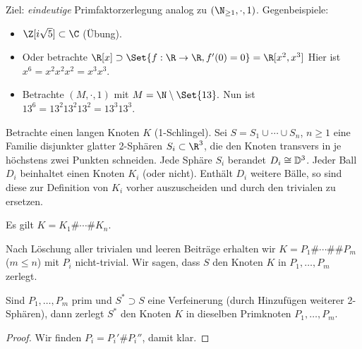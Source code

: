 Ziel: \emph{eindeutige} Primfaktorzerlegung analog zu $(\N_{\ge 1}, \cdot, 1)$.
Gegenbeispiele:
\begin{itemize}
    \item
        $\Z[i\sqrt{5}] \subset \C$ (Übung).
    \item
        Oder betrachte
        \begin{math}
            \R[x] \supset \Set{f: \R \to \R, f'(0) = 0} = \R[x^2, x^3]
        \end{math}
        Hier ist $x^6 = x^2 x^2 x^2 = x^3 x^3$.
    \item
        Betrachte $(M, \cdot, 1)$ mit
        \begin{math}
            M = \N \setminus \Set{13}.
        \end{math}
        Nun ist ${13}^6 = {13}^2 {13}^2 {13}^2 = {13}^3 {13}^3$.
\end{itemize}
Betrachte einen langen Knoten $K$ (1-Schlingel).
Sei $S = S_1 \cup \dotsb \cup S_n$, $n \ge 1$ eine Familie disjunkter glatter 2-Sphären $S_i \subset \R^3$, die den Knoten transvers in je höchstens zwei Punkten schneiden.
Jede Sphäre $S_i$ berandet $D_i \cong \mathbb { D }^3$.
Jeder Ball $D_i$ beinhaltet einen Knoten $K_i$ (oder nicht).
Enthält $D_i$ weitere Bälle, so sind diese zur Definition von $K_i$ vorher auszuscheiden und durch den trivialen zu ersetzen.

\begin{prop}
    Es gilt $K = K_1 \# \dotsb \# K_n$.
\end{prop}

\begin{df}
    Nach Löschung aller trivialen und leeren Beiträge erhalten wir $K = P_1 \# \dotsb \# \# P_m$ ($m \le n$) mit $P_i$ nicht-trivial.
    Wir sagen, dass $S$ den Knoten $K$ in $P_1, \dotsc, P_m$ zerlegt.
\end{df}

\begin{lem}
    Sind $P_1, \dotsc, P_m$ prim und $S^* \supset S$ eine Verfeinerung (durch Hinzufügen weiterer 2-Sphären), dann zerlegt $S^*$ den Knoten $K$ in dieselben Primknoten $P_1, \dotsc, P_m$.
    \begin{proof}
        Wir finden $P_i = P_i' \# P_i''$, damit klar.
    \end{proof}
\end{lem}

